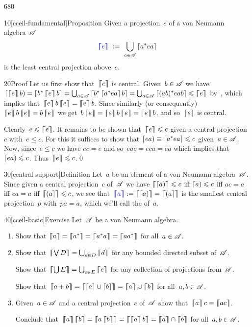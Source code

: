 \begin{parsec}{680}%
\begin{point}{10}[cceil-fundamental]{Proposition}%
Given a projection~$e$ of a von Neumann algebra~$\mathscr{A}$
\begin{equation*}
	\Define{\cceil{e}}\ :=\ 
	\bigcup_{a\in\scrA} \ceil{a^* e a}
\end{equation*}%
%
is the least central projection above~$e$.
\begin{point}{20}{Proof}%
Let us first show that~$\left\lceil\!\!\left\lceil e\right\rceil\!\!\right\rceil$ is central.
Given~$b\in\mathscr{A}$
we have $\ceill{\cceil{e}b}=\ceil{b^*\cceil{e}b}
=\bigcup_{a\in\scrA} \ceil{b^*\ceil{a^*ea}b}
= \bigcup_{a\in \scrA} \ceil{(ab)^* eab}
\leq \cceil{e}$
by~,
which implies that~$\cceil{e}b\cceil{e}=\cceil{e}b$.
Since similarly (or consequently)
$\cceil{e}b\cceil{e} = b\cceil{e}$
we get~$b\cceil{e}=\cceil{e}b\cceil{e}
=\cceil{e}b$,
and so~$\left\lceil\!\!\left\lceil e\right\rceil\!\!\right\rceil$ is central.

Clearly~$e\leqslant \left\lceil\!\!\left\lceil e\right\rceil\!\!\right\rceil$.
It remains to be shown that~$\left\lceil\!\!\left\lceil e\right\rceil\!\!\right\rceil\leqslant c$
given a central projection~$c$ with~$e\leq c$.
For this it suffices to show that $\left\lceil ea\right)\equiv \left\lceil a^*ea\right\rceil\leqslant c$
given~$a\in\mathscr{A}$.
Now, since~$e\leq c$
we have $ec=e$
and so~$eac=eca=ea$
which implies that~$\left\lceil ea\right)\leqslant c$.
Thus~$\left\lceil\!\!\left\lceil e\right\rceil\!\!\right\rceil\leqslant c$.\qed
\end{point}
\end{point}
\begin{point}{30}[central support]{Definition}%
Let~$a$ be an element of a von Neumann algebra~$\mathscr{A}$.
Since given a central projection~$c$ of~$\mathscr{A}$
we have
$\left\lceil\!\!\left\lceil\left\lceil a\right)\right\rceil\!\!\right\rceil\leqslant c$
iff $\left\lceil a\right)\leqslant c$
iff $ac=a$ 
iff
$ca=a$ iff $\left\lceil\!\!\left\lceil\left(a\right\rceil\right\rceil\!\!\right\rceil\leqslant c$,
we see that~$\Define{\cceil{a}}:=
\cceil{\ceill{a}}=\cceil{\ceilr{a}}$
is the smallest central projection~$p$
with~$p a=a$,
which we'll call the
%
	of~$a$.
\end{point}
\begin{point}{40}[cceil-basic]{Exercise}%
Let~$\mathscr{A}$ be a von Neumann algebra.
\begin{enumerate}
\item
Show that $\cceil{a}=\cceil{a^*}
=\cceil{a^*a}=\cceil{aa^*}$
for all~$a\in\mathscr{A}$.
\item
Show that~$\cceil{ \bigvee D } = \bigcup_{d\in D} \cceil{d}$
for any bounded directed subset of~$\mathscr{A}$.

Show that~$\cceil{\bigcup E} = \bigcup_{e\in E} \cceil{e}$
for any collection of projections from~$\mathscr{A}$.

Show that~$\cceil{a+b}=\cceil{\ceil{a}\cup \ceil{b}}
=\cceil{a}\cup\cceil{b}$
for all~$a,b\in \mathscr{A}$.
\item
Given~$a\in\mathscr{A}$
and a central projection~$c$ of~$\mathscr{A}$
show that~$\cceil{a}c=\cceil{ac}$.

Conclude that~$\cceil{a}\cceil{b}=\cceil{a\cceil{b}}
= \cceil{\cceil{a}b}
=\cceil{a}\cap\cceil{b}$
for all~$a,b\in\mathscr{A}$.
\end{enumerate}
\spacingfix%
\end{point}%
\end{parsec}%
